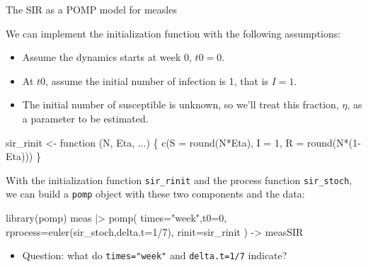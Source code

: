 \documentclass[
  ignorenonframetext,
  aspectratio=169,
  t]{beamer}
\newenvironment{Shaded}{\begin{snugshade}}{\end{snugshade}}
\newcommand{\AttributeTok}[1]{\textcolor[rgb]{0.40,0.45,0.13}{#1}}
\newcommand{\ControlFlowTok}[1]{\textcolor[rgb]{0.00,0.23,0.31}{#1}}
\newcommand{\DecValTok}[1]{\textcolor[rgb]{0.68,0.00,0.00}{#1}}
\newcommand{\FunctionTok}[1]{\textcolor[rgb]{0.28,0.35,0.67}{#1}}
\newcommand{\NormalTok}[1]{\textcolor[rgb]{0.00,0.23,0.31}{#1}}
\newcommand{\OtherTok}[1]{\textcolor[rgb]{0.00,0.23,0.31}{#1}}
\newcommand{\SpecialCharTok}[1]{\textcolor[rgb]{0.37,0.37,0.37}{#1}}
\newcommand{\StringTok}[1]{\textcolor[rgb]{0.13,0.47,0.30}{#1}}
\providecommand{\tightlist}{%
  \setlength{\itemsep}{0pt}\setlength{\parskip}{0pt}}\usepackage{longtable,booktabs,array}
\theoremstyle{definition}
\begin{document}
\begin{frame}{The SIR as a POMP model for
measles}
\framebreak

We can implement the initialization function with the following
assumptions:

\begin{itemize}
\item
  Assume the dynamics starts at week 0, \(t0=0\).
\item
  At \(t0\), assume the initial number of infection is 1, that is
  \(I=1\).
\item
  The initial number of susceptible is unknown, so we'll treat this
  fraction, \(\eta\), as a parameter to be estimated.
\end{itemize}

\begin{Shaded}
\begin{Highlighting}[]
\NormalTok{sir\_rinit }\OtherTok{\textless{}{-}} \ControlFlowTok{function}\NormalTok{ (N, Eta, ...) \{}
  \FunctionTok{c}\NormalTok{(}\AttributeTok{S =} \FunctionTok{round}\NormalTok{(N}\SpecialCharTok{*}\NormalTok{Eta), }\AttributeTok{I =} \DecValTok{1}\NormalTok{, }\AttributeTok{R =} \FunctionTok{round}\NormalTok{(N}\SpecialCharTok{*}\NormalTok{(}\DecValTok{1}\SpecialCharTok{{-}}\NormalTok{Eta)))}
\NormalTok{\}}
\end{Highlighting}
\end{Shaded}

\framebreak

With the initialization function \texttt{sir\_rinit} and the process
function \texttt{sir\_stoch}, we can build a \texttt{pomp} object with
these two components and the data:

\begin{Shaded}
\begin{Highlighting}[]
\FunctionTok{library}\NormalTok{(pomp)}
\NormalTok{meas }\SpecialCharTok{|\textgreater{}}
  \FunctionTok{pomp}\NormalTok{(}
    \AttributeTok{times=}\StringTok{"week"}\NormalTok{,}\AttributeTok{t0=}\DecValTok{0}\NormalTok{,}
    \AttributeTok{rprocess=}\FunctionTok{euler}\NormalTok{(sir\_stoch,}\AttributeTok{delta.t=}\DecValTok{1}\SpecialCharTok{/}\DecValTok{7}\NormalTok{),}
    \AttributeTok{rinit=}\NormalTok{sir\_rinit}
\NormalTok{  ) }\OtherTok{{-}\textgreater{}}\NormalTok{ measSIR}
\end{Highlighting}
\end{Shaded}

\begin{itemize}
\tightlist
\item
  Question: what do \texttt{times="week"} and \texttt{delta.t=1/7}
  indicate?
\end{itemize}


\end{frame}
\end{document}
